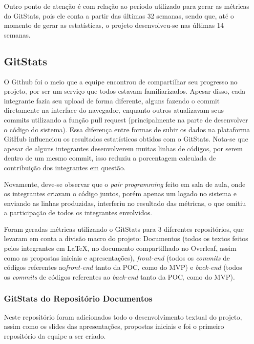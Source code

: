 \documentclass[
    12pt,               %
    openright,          %
    oneside,
    a4paper,            %
    BIBLATEX,           %
    TODO,               %
    english,            %
    brazil              %
    ]{ifsp-spo-inf-ctds}
\begin{document}
    Outro ponto de atenção é com relação ao período utilizado para gerar as métricas do GitStats, pois ele conta a partir das últimas 32 semanas, sendo que, até o momento de gerar as estatísticas, o projeto desenvolveu-se nas últimas 14 semanas.
    
    \subsection{GitStats}
    
    O Github foi o meio que a equipe encontrou de compartilhar seu progresso no projeto, por ser um serviço que todos estavam familiarizados. Apesar disso, cada integrante fazia seu upload de forma diferente, alguns fazendo o commit diretamente na interface do navegador, enquanto outros atualizavam seus commits utilizando a função pull request (principalmente na parte de desenvolver o código do sistema). Essa diferença entre formas de subir os dados na plataforma GitHub influenciou os resultados estatísticos obtidos com o GitStats. Nota-se que apesar de alguns integrantes desenvolverem muitas linhas de códigos, por serem dentro de um mesmo commit, isso reduziu a porcentagem calculada de contribuição dos integrantes em questão. 
    
    Novamente, deve-se observar que o \emph{pair programming} feito em sala de aula, onde os integrantes criavam o código juntos, porém apenas um logado no sistema e enviando as linhas produzidas, interferiu no resultado das métricas, o que omitiu a participação de todos os integrantes envolvidos.
    
    Foram geradas métricas utilizando o GitStats para 3 diferentes repositórios, que levaram em conta a divisão macro do projeto: Documentos (todos os textos feitos pelos integrantes em LaTeX, no documento compartilhado no Overleaf, assim como as propostas iniciais e apresentações), \emph{front-end} (todos os \emph{commits} de códigos referentes ao\emph{front-end} tanto da POC, como do MVP) e \emph{back-end} (todos os \emph{commits} de códigos referentes ao \emph{back-end} tanto da POC, como do MVP).


    \subsubsection{GitStats do Repositório Documentos}
    
    Neste repositório foram adicionados todo o desenvolvimento textual do projeto, assim como os slides das apresentações, propostas iniciais e foi o primeiro repositório da equipe a ser criado. 
    
\end{document}
